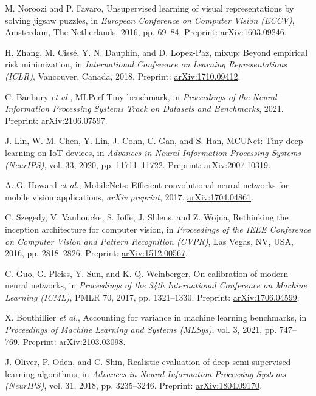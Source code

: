 M. Noroozi and P. Favaro,
\newblock Unsupervised learning of visual representations by solving jigsaw
  puzzles,
\newblock in \emph{European Conference on Computer Vision (ECCV)}, Amsterdam,
  The Netherlands, 2016, pp. 69--84.
\newblock Preprint: \href{https://arxiv.org/abs/1603.09246}{arXiv:1603.09246}.

H. Zhang, M. Ciss\'e, Y. N. Dauphin, and D. Lopez-Paz,
\newblock mixup: Beyond empirical risk minimization,
\newblock in \emph{International Conference on Learning Representations (ICLR)},
  Vancouver, Canada, 2018.
\newblock Preprint: \href{https://arxiv.org/abs/1710.09412}{arXiv:1710.09412}.

C. Banbury \emph{et al.},
\newblock MLPerf Tiny benchmark,
\newblock in \emph{Proceedings of the Neural Information Processing Systems
  Track on Datasets and Benchmarks}, 2021.
\newblock Preprint: \href{https://arxiv.org/abs/2106.07597}{arXiv:2106.07597}.

J. Lin, W.-M. Chen, Y. Lin, J. Cohn, C. Gan, and S. Han,
\newblock MCUNet: Tiny deep learning on IoT devices,
\newblock in \emph{Advances in Neural Information Processing Systems (NeurIPS)},
  vol. 33, 2020, pp. 11711--11722.
\newblock Preprint: \href{https://arxiv.org/abs/2007.10319}{arXiv:2007.10319}.

A. G. Howard \emph{et al.},
\newblock MobileNets: Efficient convolutional neural networks for mobile vision
  applications,
\newblock \emph{arXiv preprint}, 2017.
\newblock \href{https://arxiv.org/abs/1704.04861}{arXiv:1704.04861}.

C. Szegedy, V. Vanhoucke, S. Ioffe, J. Shlens, and Z. Wojna,
\newblock Rethinking the inception architecture for computer vision,
\newblock in \emph{Proceedings of the IEEE Conference on Computer Vision and
  Pattern Recognition (CVPR)}, Las Vegas, NV, USA, 2016, pp. 2818--2826.
\newblock Preprint: \href{https://arxiv.org/abs/1512.00567}{arXiv:1512.00567}.

C. Guo, G. Pleiss, Y. Sun, and K. Q. Weinberger,
\newblock On calibration of modern neural networks,
\newblock in \emph{Proceedings of the 34th International Conference on Machine
  Learning (ICML)}, PMLR 70, 2017, pp. 1321--1330.
\newblock Preprint: \href{https://arxiv.org/abs/1706.04599}{arXiv:1706.04599}.

X. Bouthillier \emph{et al.},
\newblock Accounting for variance in machine learning benchmarks,
\newblock in \emph{Proceedings of Machine Learning and Systems (MLSys)}, vol. 3,
  2021, pp. 747--769.
\newblock Preprint: \href{https://arxiv.org/abs/2103.03098}{arXiv:2103.03098}.

J. Oliver, P. Oden, and C. Shin,
\newblock Realistic evaluation of deep semi-supervised learning algorithms,
\newblock in \emph{Advances in Neural Information Processing Systems (NeurIPS)},
  vol. 31, 2018, pp. 3235--3246.
\newblock Preprint: \href{https://arxiv.org/abs/1804.09170}{arXiv:1804.09170}.

